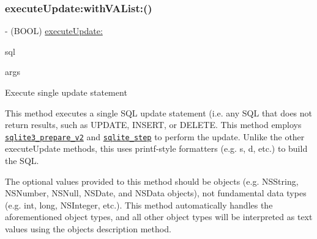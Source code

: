\subsubsection{\texorpdfstring{execute\+Update\+:with\+V\+A\+List\+:()}{executeUpdate:withVAList:()}}
{\footnotesize\ttfamily -\/ (B\+O\+OL) \mbox{\hyperlink{interface_o_p_t_l_y_f_m_d_b_database_aacce81f6c3456a804e1d558462bca313}{execute\+Update\+:}} \begin{DoxyParamCaption}\item[{(N\+S\+String$\ast$)}]{sql }\item[{withVAList:(va\+\_\+list)}]{args }\end{DoxyParamCaption}}

Execute single update statement

This method executes a single S\+QL update statement (i.\+e. any S\+QL that does not return results, such as {\ttfamily U\+P\+D\+A\+TE}, {\ttfamily I\+N\+S\+E\+RT}, or {\ttfamily D\+E\+L\+E\+TE}. This method employs \href{http://sqlite.org/c3ref/prepare.html}{\tt {\ttfamily sqlite3\+\_\+prepare\+\_\+v2}} and \href{http://sqlite.org/c3ref/step.html}{\tt {\ttfamily sqlite\+\_\+step}} to perform the update. Unlike the other {\ttfamily execute\+Update} methods, this uses printf-\/style formatters (e.\+g. {\ttfamily s}, {\ttfamily d}, etc.) to build the S\+QL.

The optional values provided to this method should be objects (e.\+g. {\ttfamily N\+S\+String}, {\ttfamily N\+S\+Number}, {\ttfamily N\+S\+Null}, {\ttfamily N\+S\+Date}, and {\ttfamily N\+S\+Data} objects), not fundamental data types (e.\+g. {\ttfamily int}, {\ttfamily long}, {\ttfamily N\+S\+Integer}, etc.). This method automatically handles the aforementioned object types, and all other object types will be interpreted as text values using the object\textquotesingle{}s {\ttfamily description} method.


